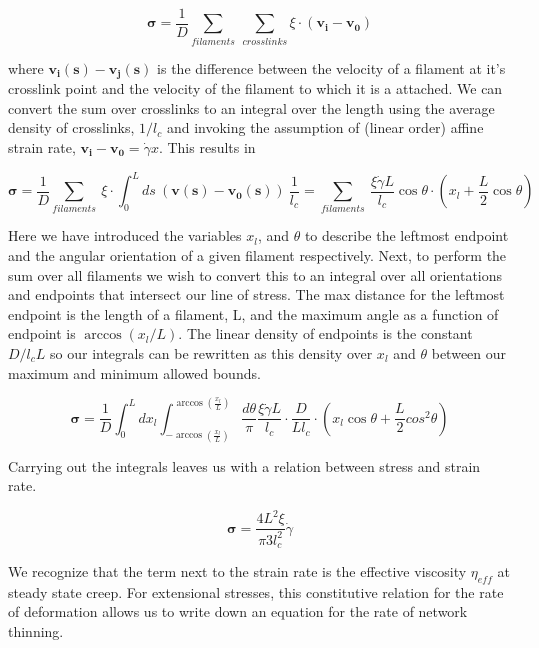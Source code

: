 \documentclass[prb,11pt]{revtex4-1}
\begin{document}
\begin{equation}
\mathbf{\sigma} = \frac{1}{D}\sum_{filaments}\: \sum_{crosslinks}\xi \cdot (\mathbf{v_i}-\mathbf{v_0})
\end{equation}

where $\mathbf{v_i(s)}-\mathbf{v_j(s)}$ is the difference between the velocity of a filament at it's crosslink point and the velocity of the filament to which it is a attached. We can convert the sum over crosslinks to an integral over the length using the average density of crosslinks, $1/l_c$ and invoking the assumption of (linear order) affine strain rate, $\mathbf{v_i}-\mathbf{v_0}=\dot \gamma x$. This results in

\begin{equation}
\mathbf{\sigma} =  \frac{1}{D}\sum_{filaments}\:  \xi \cdot \int_0^L ds \: (\mathbf{v(s)}-\mathbf{v_0(s)}) \:\frac{1}{l_c} = \sum_{filaments}\:  \frac{\xi \dot \gamma L}{l_c} \cos \theta \cdot (x_l + \frac{L}{2} \cos \theta)
\end{equation}

Here we have introduced the variables $x_l$, and $\theta$ to describe the leftmost endpoint and the angular orientation of a given filament respectively.  Next, to perform the sum over all filaments we wish to convert this to an integral over all orientations and endpoints that intersect our line of stress. The max distance for the leftmost endpoint is the length of a filament, L, and the maximum angle as a function of endpoint is $\arccos(x_l/L)$.  The linear density of endpoints is the constant $D/l_cL$ so our integrals can be rewritten as this density over $x_l$ and $\theta$ between our maximum and minimum allowed bounds.

\begin{equation}
\mathbf{\sigma} =  \frac{1}{D} \int_0^L dx_l \int_{-\arccos (\frac{x_l}{L})}^{\arccos (\frac{x_l}{L})}\frac{d\theta}{\pi} \frac{\xi \dot \gamma L}{l_c} \cdot \frac{D}{Ll_c}\cdot (x_l \cos \theta + \frac{L}{2} cos^2\theta)
\end{equation}

Carrying out the integrals leaves us with a relation between stress and strain rate.

\begin{equation}
\mathbf{\sigma} = \frac{4L^2 \xi}{\pi3l_c^2} \dot \gamma \end{equation}

We recognize that the term next to the strain rate is the effective viscosity $\eta_{eff}$ at steady state creep.  For extensional stresses, this constitutive relation for the rate of deformation allows us to write down an equation for the rate of network thinning.  
\end{document}
